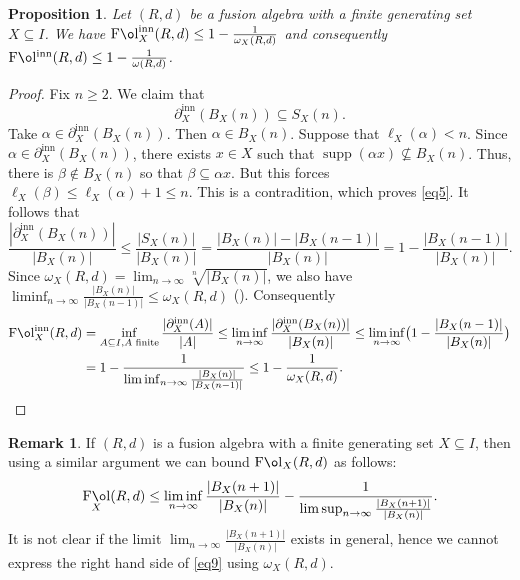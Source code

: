 \documentclass[11 pt, leqno]{amsart}
\DeclareMathOperator{\Fol}{F\mathrm{\o}l}
\DeclareMathOperator{\Folinn}{F\mathrm{\o}l^{inn}}
\newcommand{\FolinnX}{\operatorname{F\mathrm{\o}l}_{X}^{\operatorname{inn}}}
\DeclareMathOperator{\supp}{supp}
\DeclareMathOperator{\inn}{inn}
\newtheorem{proposition}[theorem]{Proposition}
\theoremstyle{definition}
\newtheorem{remark}[theorem]{Remark}
\numberwithin{equation}{section}
\begin{document}
\begin{proposition}\label{prop1}
	Let $(R,d)$ be a fusion algebra with a finite generating set $X\subseteq I$. We have $\FolinnX(R,d)\le 1-\tfrac{1}{\omega_X(R,d)}$ and consequently $\Folinn(R,d)\le 1-\tfrac{1}{\omega(R,d)}$.
\end{proposition}

\begin{proof}
Fix $n\ge 2$. We claim that
\begin{equation}\label{eq5}
\partial_X^{\inn}(B_X(n))\subseteq S_X(n).
\end{equation}
Take $\alpha\in \partial_X^{\inn}(B_X(n))$. Then $\alpha\in B_X(n)$. Suppose that $\ell_X(\alpha)<n$. Since $\alpha\in \partial^{\inn}_X(B_X(n))$, there exists $x\in X$ such that $\supp(\alpha x)\nsubseteq B_X(n)$. Thus, there is $\beta\notin B_X(n)$ so that $\beta\subseteq \alpha x$. But this forces $\ell_X(\beta) \le \ell_X(\alpha)+1\le n$. This is a contradition, which proves \eqref{eq5}. It follows that 
	\[
	\frac{ |\partial^{\inn}_X(B_X(n))|}{|B_X(n)|}\le \frac{|S_X(n)|}{|B_X(n)|}= 
	\frac{|B_X(n)|-|B_X(n-1)|}{|B_X(n)|}=1- \frac{|B_X(n-1)|}{|B_X(n)|}.
	\]
	Since $\omega_X(R,d)=\lim_{n\to\infty} \sqrt[n]{|B_X(n)|}$, we also have $\liminf_{n\to\infty} \tfrac{|B_X(n)|}{|B_X(n-1)|}\le \omega_X(R,d)$ (\cite[Theorem 3.37]{RudinPMA}). Consequently
\[\begin{split}
\FolinnX(R,d) &=\inf_{A\subseteq I, A \textup{ finite}} \frac{|\partial_X^{\inn} (A)|}{|A|}\le 
\liminf_{n\to\infty}
\frac{ |\partial^{\inn}_X(B_X(n))|}{|B_X(n)|}
\le \liminf_{n\to\infty} \bigl(1- \frac{|B_X(n-1)|}{|B_X(n)|}\bigr)\\
&=
		1-\frac{1}{\liminf_{n\to\infty} \tfrac{|B_X(n)|}{|B_X(n-1)|}}\le 
		1-\frac{1}{\omega_X(R,d)}.
	\end{split}\]
\end{proof}

\begin{remark}
If $(R,d)$ is a fusion algebra with a finite generating set $X\subseteq I$, then using a similar argument we can bound $\Fol_X(R,d)$ as follows:
\begin{equation}\label{eq9}
\Fol_X(R,d)\le \liminf_{n\to\infty} \frac{|B_X(n+1)|}{|B_X(n)|} - \frac{1}{\limsup_{n\to\infty} \frac{|B_X(n+1)|}{|B_X(n)|}}.
\end{equation}
It is not clear if the limit $\lim_{n\to\infty} \tfrac{|B_X(n+1)|}{|B_X(n)|}$ exists in general, hence we cannot express the right hand side of \eqref{eq9} using $\omega_X(R,d)$.
\end{remark}
\end{document}
